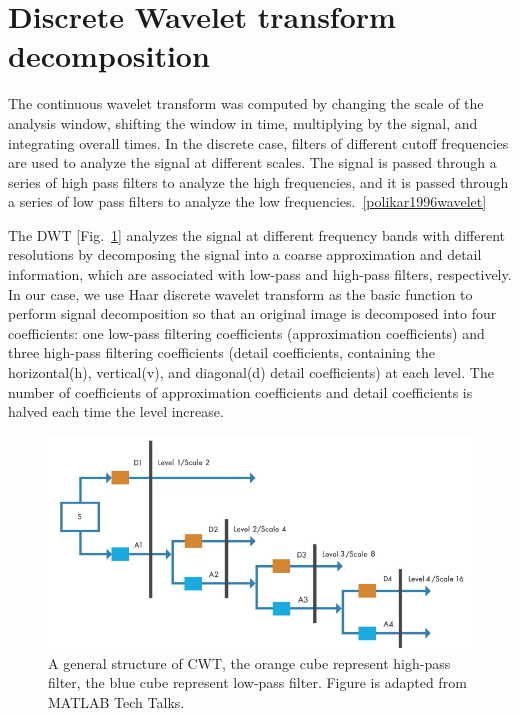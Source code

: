 \section{Discrete Wavelet transform decomposition}

The continuous wavelet transform was computed by changing the scale of the analysis window, shifting the window in time, multiplying by the signal, and integrating overall times. In the discrete case, filters of different cutoff frequencies are used to analyze the signal at different scales. The signal is passed through a series of high pass filters to analyze the high frequencies, and it is passed through a series of low pass filters to analyze the low frequencies.~\ref{polikar1996wavelet}


The DWT [Fig.~\ref{fig:dwt}] analyzes the signal at different frequency bands with different resolutions by decomposing the signal into a coarse approximation and detail information, which are associated with low-pass and high-pass filters, respectively. In our case, we use Haar discrete wavelet transform as the basic function to perform signal decomposition so that an original image is decomposed into four coefficients: one low-pass filtering coefficients (approximation coefficients) and three high-pass filtering coefficients (detail coefficients, containing the horizontal(h), vertical(v), and diagonal(d) detail coefficients) at each level. The number of coefficients of approximation coefficients and detail coefficients is halved each time the level increase.



\begin{figure}[h]
\centering
\includegraphics[width=1\textwidth]{images/dwt.png}
\caption[Structure of CNNs]{A general structure of CWT, the orange cube represent high-pass filter, the blue cube represent low-pass filter. Figure is adapted from MATLAB Tech Talks.}
\label{fig:dwt}
\end{figure}


